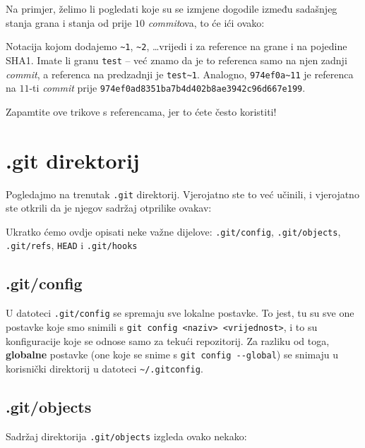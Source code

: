 Na primjer, želimo li pogledati koje su se izmjene dogodile između sadašnjeg stanja grana i stanja od prije $10$ \emph{commit}ova, to će ići ovako:


Notacija kojom dodajemo \verb+~1+, \verb+~2+, \dots vrijedi i za reference na grane i na pojedine SHA1.
Imate li granu \verb+test+ -- već znamo da je to referenca samo na njen zadnji \emph{commit}, a referenca na predzadnji je \verb+test~1+.
Analogno, \verb+974ef0a~11+ je referenca na $11$-ti \emph{commit} prije \verb+974ef0ad8351ba7b4d402b8ae3942c96d667e199+.

Zapamtite ove trikove s referencama, jer to ćete često koristiti!

\section*{.git direktorij}

Pogledajmo na trenutak \verb+.git+ direktorij. 
Vjerojatno ste to već učinili, i vjerojatno ste otkrili da je njegov sadržaj otprilike ovakav:



Ukratko ćemo ovdje opisati neke važne dijelove: \verb+.git/config+, \verb+.git/objects+, \verb+.git/refs+, \verb+HEAD+ i \verb+.git/hooks+

\subsection*{.git/config}

U datoteci \verb+.git/config+ se spremaju sve lokalne postavke.
To jest, tu su sve one postavke koje smo snimili s \verb+git config <naziv> <vrijednost>+, i to su konfiguracije koje se odnose samo za tekući repozitorij.
Za razliku od toga, \textbf{globalne} postavke (one koje se snime s \verb+git config --global+) se snimaju u korisnički direktorij u datoteci \verb+~/.gitconfig+.

\subsection*{.git/objects}

Sadržaj direktorija \verb+.git/objects+ izgleda ovako nekako:



